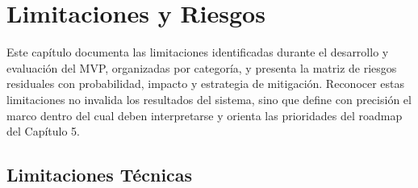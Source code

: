 \chapter{Limitaciones y Riesgos}

Este capítulo documenta las limitaciones identificadas durante el desarrollo
y evaluación del MVP, organizadas por categoría, y presenta la matriz de
riesgos residuales con probabilidad, impacto y estrategia de mitigación.
Reconocer estas limitaciones no invalida los resultados del sistema, sino
que define con precisión el marco dentro del cual deben interpretarse
y orienta las prioridades del roadmap del Capítulo 5.

\section*{Limitaciones Técnicas}

